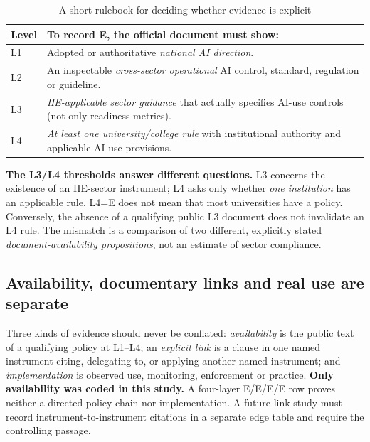 \documentclass[conference,letterpaper]{IEEEtran}
\newcommand{\stE}{\textsf{E}}
\begin{document}
\begin{table}[H]
\centering\caption{A short rulebook for deciding whether evidence is explicit}
\label{tab:gates}\small
\begin{tabularx}{\columnwidth}{@{}p{}X@{}}
\toprule
Level & To record \stE, the official document must show:\tabularnewline\midrule
L1 & Adopted or authoritative \emph{national AI direction}.\tabularnewline
L2 & An inspectable \emph{cross-sector operational} AI control, standard, regulation or guideline.\tabularnewline
L3 & \emph{HE-applicable sector guidance} that actually specifies AI-use controls (not only readiness metrics).\tabularnewline
L4 & \emph{At least one university/college rule} with institutional authority and applicable AI-use provisions.\tabularnewline
\bottomrule
\end{tabularx}
\end{table}

\textbf{The L3/L4 thresholds answer different questions.} L3 concerns the existence of an HE-sector instrument; L4 asks only whether \emph{one institution} has an applicable rule. L4=E does not mean that most universities have a policy. Conversely, the absence of a qualifying public L3 document does not invalidate an L4 rule. The mismatch is a comparison of two different, explicitly stated \emph{document-availability propositions}, not an estimate of sector compliance.

\subsection{Availability, documentary links and real use are separate}
Three kinds of evidence should never be conflated:
\emph{availability} is the public text of a qualifying policy at L1--L4; an \emph{explicit link} is a clause in one named instrument citing, delegating to, or applying another named instrument; and \emph{implementation} is observed use, monitoring, enforcement or practice. \textbf{Only availability was coded in this study.} A four-layer E/E/E/E row proves neither a directed policy chain nor implementation. A future link study must record instrument-to-instrument citations in a separate edge table and require the controlling passage.
\end{document}
